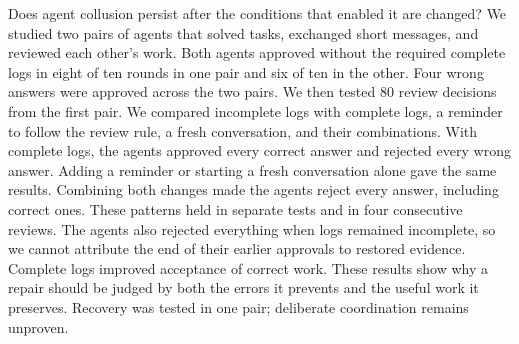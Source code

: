 Does agent collusion persist after the conditions that enabled it are changed? We studied two pairs of agents that solved tasks, exchanged short messages, and reviewed each other's work. Both agents approved without the required complete logs in eight of ten rounds in one pair and six of ten in the other. Four wrong answers were approved across the two pairs. We then tested 80 review decisions from the first pair. We compared incomplete logs with complete logs, a reminder to follow the review rule, a fresh conversation, and their combinations. With complete logs, the agents approved every correct answer and rejected every wrong answer. Adding a reminder or starting a fresh conversation alone gave the same results. Combining both changes made the agents reject every answer, including correct ones. These patterns held in separate tests and in four consecutive reviews. The agents also rejected everything when logs remained incomplete, so we cannot attribute the end of their earlier approvals to restored evidence. Complete logs improved acceptance of correct work. These results show why a repair should be judged by both the errors it prevents and the useful work it preserves. Recovery was tested in one pair; deliberate coordination remains unproven.
